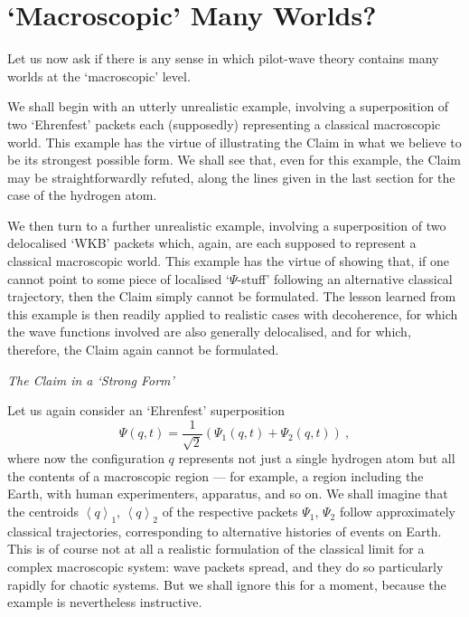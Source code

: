 \documentclass[12pt]{article}%
\begin{document}
\section{`Macroscopic' Many Worlds?}

Let us now ask if there is any sense in which pilot-wave theory contains many
worlds at the `macroscopic' level.

We shall begin with an utterly unrealistic example, involving a superposition
of two `Ehrenfest' packets each (supposedly) representing a classical
macroscopic world. This example has the virtue of illustrating the Claim in
what we believe to be its strongest possible form. We shall see that, even for
this example, the Claim may be straightforwardly refuted, along the lines
given in the last section for the case of the hydrogen atom.

We then turn to a further unrealistic example, involving a superposition of
two delocalised `WKB' packets which, again, are each supposed to represent a
classical macroscopic world. This example has the virtue of showing that, if
one cannot point to some piece of localised `$\Psi$-stuff' following an
alternative classical trajectory, then the Claim simply cannot be formulated.
The lesson learned from this example is then readily applied to realistic
cases with decoherence, for which the wave functions involved are also
generally delocalised, and for which, therefore, the Claim again cannot be formulated.

\begin{center}
\textit{The Claim in a `Strong Form'}
\end{center}

Let us again consider an `Ehrenfest' superposition%
\[
\Psi(q,t)=\frac{1}{\sqrt{2}}\left(  \Psi_{1}(q,t)+\Psi_{2}(q,t)\right)  \ ,
\]
where now the configuration $q$ represents not just a single hydrogen atom but
all the contents of a macroscopic region --- for example, a region including
the Earth, with human experimenters, apparatus, and so on. We shall imagine
that the centroids $\left\langle q\right\rangle _{1}$, $\left\langle
q\right\rangle _{2}$ of the respective packets $\Psi_{1}$, $\Psi_{2}$ follow
approximately classical trajectories, corresponding to alternative histories
of events on Earth. This is of course not at all a realistic formulation of
the classical limit for a complex macroscopic system: wave packets spread, and
they do so particularly rapidly for chaotic systems. But we shall ignore this
for a moment, because the example is nevertheless instructive.
\end{document}
